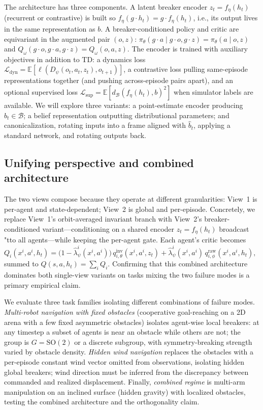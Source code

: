 \documentclass[11pt]{article}
\begin{document}
The architecture has three components. A latent breaker encoder $z_t = f_\eta(h_t)$ (recurrent or contrastive) is built so $f_\eta(g \cdot h_t) = g \cdot f_\eta(h_t)$, i.e., its output lives in the same representation as $b$. A breaker-conditioned policy and critic are equivariant in the augmented pair $(o, z)$: $\pi_\theta(g \cdot a \mid g \cdot o, g \cdot z) = \pi_\theta(a \mid o, z)$ and $Q_\omega(g \cdot o, g \cdot a, g \cdot z) = Q_\omega(o,a,z)$. The encoder is trained with auxiliary objectives in addition to TD: a dynamics loss $\mathcal{L}_{\text{dyn}} = \mathbb{E}[\ell(D_\psi(o_t, a_t, z_t), o_{t+1})]$, a contrastive loss pulling same-episode representations together (and pushing across-episode pairs apart), and an optional supervised loss $\mathcal{L}_{\text{sup}} = \mathbb{E}[d_\mathcal{B}(f_\eta(h_t), b)^2]$ when simulator labels are available. We will explore three variants: a point-estimate encoder producing $\widehat{b}_t \in \mathcal{B}$; a belief representation outputting distributional parameters; and canonicalization, rotating inputs into a frame aligned with $\widehat{b}_t$, applying a standard network, and rotating outputs back.

\subsection{Unifying perspective and combined architecture}
\label{sec:unified}
The two views compose because they operate at different granularities: View~1 is per-agent and state-dependent; View~2 is global and per-episode. Concretely, we replace View~1's orbit-averaged invariant branch with View~2's breaker-conditioned variant—conditioning on a shared encoder $z_t = f_\eta(h_t)$ broadcast "tto all agents—while keeping the per-agent gate. Each agent's critic becomes
$
Q_i(x^i, a^i, h_t) = \bigl(1 - \widehat{\lambda}^i_\psi(x^i, a^i)\bigr)\,q^{\text{inv}}_{i,\theta}(x^i, a^i, z_t) + \widehat{\lambda}^i_\psi(x^i, a^i)\,q^{\text{raw}}_{i,\phi}(x^i, a^i, h_t),
$
summed to $Q(s,a,h_t) = \sum_i Q_i$. Confirming that this combined architecture dominates both single-view variants on tasks mixing the two failure modes is a primary empirical claim.

We evaluate  three task families isolating different combinations of failure modes. \emph{Multi-robot navigation with fixed obstacles} (cooperative goal-reaching on a 2D arena with a few fixed asymmetric obstacles) isolates agent-wise local breakers: at any timestep a subset of agents is near an obstacle while others are not; the group is $G = \mathrm{SO}(2)$ or a discrete subgroup, with symmetry-breaking strength varied by obstacle density. \emph{Hidden wind navigation} replaces the obstacles with a per-episode constant wind vector omitted from observations, isolating hidden global breakers; wind direction must be inferred from the discrepancy between commanded and realized displacement. Finally, \emph{combined regime} is multi-arm manipulation on an inclined surface (hidden gravity) with localized obstacles, testing the combined architecture and the orthogonality claim.
\end{document}
